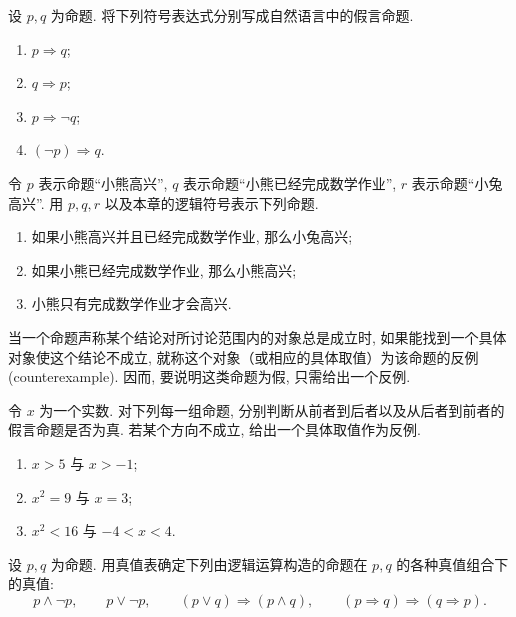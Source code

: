 \documentclass[usesamecnt, thmcnt=section, lang=cn, newtx, 10pt, scheme=chinese]{elegantbook}
\begin{document}
\begin{exercise}
\label{ex:logic-07}
设 $p,q$ 为命题. 将下列符号表达式分别写成自然语言中的假言命题.
\begin{enumerate}[label=\rm(\arabic*)]
  \item $p\Rightarrow q$;
  \item $q\Rightarrow p$;
  \item $p\Rightarrow\neg q$;
  \item $(\neg p)\Rightarrow q$.
\end{enumerate}
\end{exercise}

\begin{exercise}
\label{ex:basic-logic-03}
令 $p$ 表示命题``小熊高兴'', $q$ 表示命题``小熊已经完成数学作业'', $r$ 表示命题``小兔高兴''. 用 $p,q,r$ 以及本章的逻辑符号表示下列命题.
\begin{enumerate}[label=\rm(\arabic*)]
  \item 如果小熊高兴并且已经完成数学作业, 那么小兔高兴;
  \item 如果小熊已经完成数学作业, 那么小熊高兴;
  \item 小熊只有完成数学作业才会高兴.
\end{enumerate}
\end{exercise}

\begin{definition}[反例]
当一个命题声称某个结论对所讨论范围内的对象总是成立时, 如果能找到一个具体对象使这个结论不成立, 就称这个对象（或相应的具体取值）为该命题的{\color{blue}反例 (counterexample)}. 因而, 要说明这类命题为假, 只需给出一个反例.
\end{definition}

\begin{exercise}
\label{ex:logic-08}
令 $x$ 为一个实数. 对下列每一组命题, 分别判断从前者到后者以及从后者到前者的假言命题是否为真. 若某个方向不成立, 给出一个具体取值作为反例.
\begin{enumerate}[label=\rm(\arabic*)]
  \item $x>5$ 与 $x>-1$;
  \item $x^2=9$ 与 $x=3$;
  \item $x^2<16$ 与 $-4<x<4$.
\end{enumerate}
\end{exercise}

\begin{exercise}
\label{ex:basic-logic-01}
设 $p,q$ 为命题. 用真值表确定下列由逻辑运算构造的命题在 $p,q$ 的各种真值组合下的真值:
\[
 p\wedge\neg p,\qquad
 p\vee\neg p,\qquad
 (p\vee q)\Rightarrow(p\wedge q),\qquad
 (p\Rightarrow q)\Rightarrow(q\Rightarrow p).
\]
\end{exercise}
\end{document}
